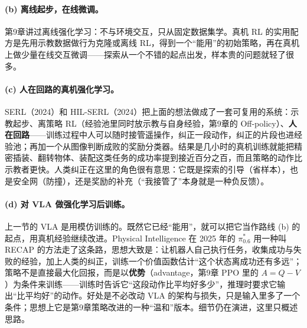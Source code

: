 \paragraph{(b) 离线起步，在线微调。}
第9章讲过离线强化学习：不与环境交互，只从固定数据集学。真机 RL 的实用配方是先用示教数据做行为克隆或离线 RL，得到一个“能用”的初始策略，再在真机上做少量在线交互微调——探索从一个不错的起点出发，样本贵的问题就轻了很多。

\paragraph{(c) 人在回路的真机强化学习。}
SERL（2024）和 HIL-SERL（2024）把上面的想法做成了一套可复用的系统：示教起步、离策略 RL（经验池里同时放示教与自身经验，第9章的 Off-policy）、\textbf{人在回路}——训练过程中人可以随时接管遥操作，纠正一段动作，纠正的片段也进经验池；再加一个从图像判断成败的奖励分类器。结果是几小时的真机训练就能把精密插装、翻转物体、装配这类任务的成功率提到接近百分之百，而且策略的动作比示教者更快。人类纠正在这里的角色很有意思：它既是探索的引导（省样本），也是安全网（防撞），还是奖励的补充（“我接管了”本身就是一种负反馈）。

\paragraph{(d) 对 VLA 做强化学习后训练。}
上一节的 VLA 是用模仿训练的。既然它已经“能用”，就可以把它当作路线 (b) 的起点，用真机经验继续改进。Physical Intelligence 在 2025 年的 $\pi^{*}_{0.6}$ 用一种叫 RECAP 的方法走了这条路，思想大致是：让机器人自己执行任务，收集成功与失败的经验，加上人类的纠正，训练一个价值函数估计“这个状态离成功还有多远”；策略不是直接最大化回报，而是以\textbf{优势}（advantage，第9章 PPO 里的 $A = Q - V$）为条件来训练——训练时告诉它“这段动作比平均好多少”，推理时要求它输出“比平均好”的动作。好处是不必改动 VLA 的架构与损失，只是输入里多了一个条件；思想上它是第9章策略改进的一种“温和”版本。细节仍在演进，这里只概述思路。

